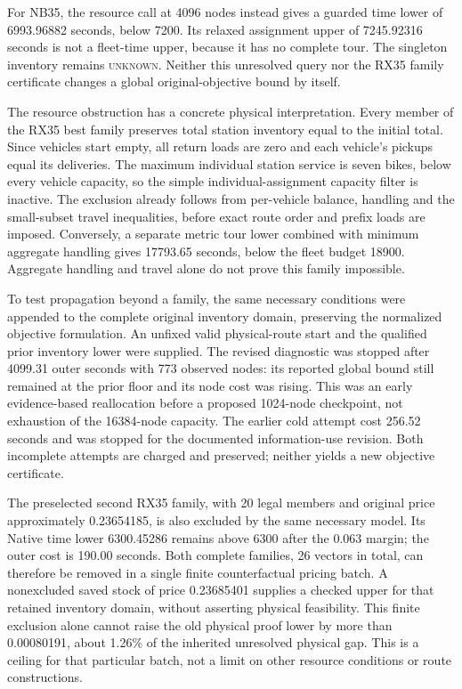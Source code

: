 \documentclass[11pt]{article}
\begin{document}
For NB35, the resource call at 4096 nodes instead gives a guarded time lower
of 6993.96882 seconds, below 7200. Its relaxed assignment upper of 7245.92316
seconds is not a fleet-time upper, because it has no complete tour.
The singleton inventory remains \textsc{unknown}. Neither this unresolved
query nor the RX35 family certificate changes a global original-objective
bound by itself.

The resource obstruction has a concrete physical interpretation. Every
member of the RX35 best family preserves total station inventory equal
to the initial total. Since vehicles start empty, all return loads are
zero and each vehicle's pickups equal its deliveries. The maximum
individual station service is seven bikes, below every vehicle capacity,
so the simple individual-assignment capacity filter is inactive. The
exclusion already follows from per-vehicle balance, handling and the
small-subset travel inequalities, before exact route order and prefix
loads are imposed. Conversely, a separate metric tour lower combined
with minimum aggregate handling gives 17793.65 seconds, below the fleet
budget 18900. Aggregate handling and travel alone do not prove this
family impossible.

To test propagation beyond a family, the same necessary conditions were
appended to the complete original inventory domain, preserving the
normalized objective formulation. An unfixed valid physical-route start
and the qualified prior inventory lower were supplied. The revised
diagnostic was stopped after 4099.31 outer seconds with 773 observed
nodes: its reported global bound still remained at the prior floor and
its node cost was rising. This was an early evidence-based reallocation
before a proposed 1024-node checkpoint, not exhaustion of the 16384-node
capacity. The earlier cold attempt cost 256.52 seconds and was stopped
for the documented information-use revision. Both incomplete attempts
are charged and preserved; neither yields a new objective certificate.

The preselected second RX35 family, with 20 legal members and original
price approximately 0.23654185, is also excluded by the same necessary
model. Its Native time lower 6300.45286 remains above 6300 after the
0.063 margin; the outer cost is 190.00 seconds. Both complete families,
26 vectors in total, can therefore be removed in a single finite
counterfactual pricing batch. A nonexcluded saved stock of price
0.23685401 supplies a checked upper for that retained inventory domain,
without asserting physical feasibility. This finite exclusion alone
cannot raise the old physical proof lower by more than 0.00080191,
about 1.26\% of the inherited unresolved physical gap. This is a ceiling
for that particular batch, not a limit on other resource conditions or
route constructions.
\end{document}

